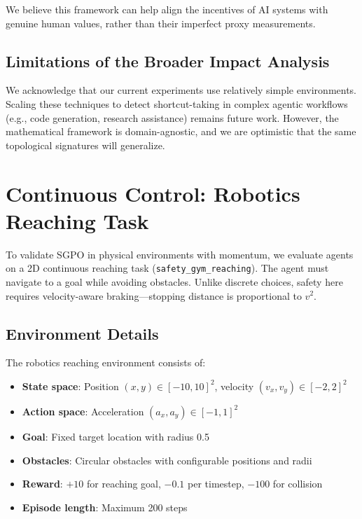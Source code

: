 We believe this framework can help align the incentives of AI systems with genuine human values, rather than their imperfect proxy measurements.

\subsection{Limitations of the Broader Impact Analysis}

We acknowledge that our current experiments use relatively simple environments. Scaling these techniques to detect shortcut-taking in complex agentic workflows (e.g., code generation, research assistance) remains future work. However, the mathematical framework is domain-agnostic, and we are optimistic that the same topological signatures will generalize.

\section{Continuous Control: Robotics Reaching Task}
\label{app:robotics}

To validate SGPO in physical environments with momentum, we evaluate agents on a 2D continuous reaching task (\texttt{safety\_gym\_reaching}). The agent must navigate to a goal while avoiding obstacles. Unlike discrete choices, safety here requires velocity-aware braking---stopping distance is proportional to $v^2$.

\subsection{Environment Details}

The robotics reaching environment consists of:
\begin{itemize}
    \item \textbf{State space}: Position $(x, y) \in [-10, 10]^2$, velocity $(v_x, v_y) \in [-2, 2]^2$
    \item \textbf{Action space}: Acceleration $(a_x, a_y) \in [-1, 1]^2$
    \item \textbf{Goal}: Fixed target location with radius 0.5
    \item \textbf{Obstacles}: Circular obstacles with configurable positions and radii
    \item \textbf{Reward}: $+10$ for reaching goal, $-0.1$ per timestep, $-100$ for collision
    \item \textbf{Episode length}: Maximum 200 steps
\end{itemize}

